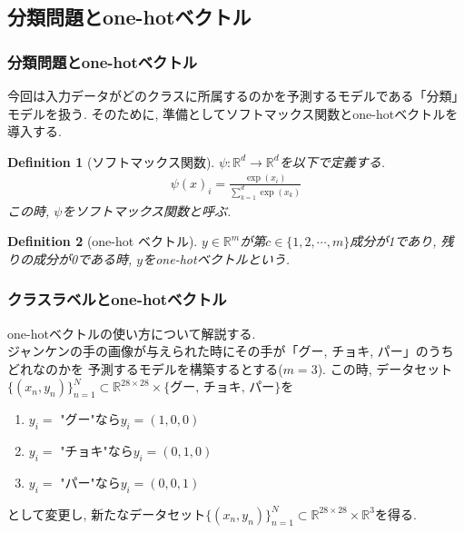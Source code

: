 \documentclass[dvipdfmx,11pt]{beamer}		%
\newtheorem{defi}{Definition}
\newcommand{\R}{\mathbb{R}}
\begin{document}
    \subsection{分類問題とone-hotベクトル}
    \begin{frame}
        \frametitle{分類問題とone-hotベクトル}
        今回は入力データがどのクラスに所属するのかを予測するモデルである「分類」モデルを扱う. 
        そのために, 準備としてソフトマックス関数とone-hotベクトルを導入する. 
        \begin{defi}[ソフトマックス関数]
            $\psi:\R^d\to\R^d$を以下で定義する.
            \begin{align*}
                \psi(x)_{i} = \frac{\exp(x_i)}{\sum_{k = 1}^d\exp(x_k)}
            \end{align*}
            この時, $\psi$をソフトマックス関数と呼ぶ.
        \end{defi}
        \begin{defi}[one-hot ベクトル]
            $y\in\R^m$が第$c\in\{1, 2, \cdots, m\}$成分が1であり, 残りの成分が0である時, 
            $y$をone-hotベクトルという.
        \end{defi}
    \end{frame}
    \begin{frame}
        \frametitle{クラスラベルとone-hotベクトル}
        one-hotベクトルの使い方について解説する. \\
        ジャンケンの手の画像が与えられた時にその手が「グー, チョキ, パー」のうちどれなのかを
        予測するモデルを構築するとする($m = 3$). 
        この時, データセット$\{(x_{n}, y_{n})\}_{n = 1}^{N}\subset \R^{28\times 28}\times\{\text{グー, チョキ, パー}\}$を
        \begin{enumerate}
            \item $y_{i} =$ "グー"なら$y_i = (1, 0, 0)$
            \item $y_{i} =$ "チョキ"なら$y_i = (0, 1, 0)$
            \item $y_{i} =$ "パー"なら$y_i = (0, 0, 1)$
        \end{enumerate}
        として変更し, 新たなデータセット$\{(x_{n}, y_{n})\}_{n = 1}^{N}\subset \R^{28\times 28}\times\R^3$を得る. 
    \end{frame}
\end{document}
